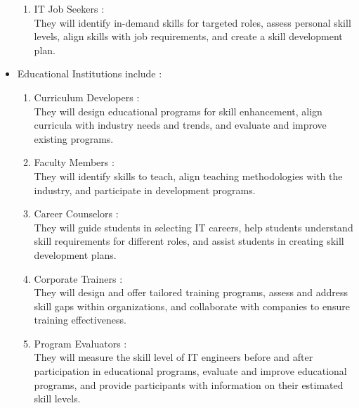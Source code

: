 \begin{itemize}
\begin{enumerate}
              \item IT Job Seekers : \\
                    They will identify in-demand skills for targeted roles, assess personal skill levels, align skills with job requirements, and create a skill development plan.
          \end{enumerate}
    \item Educational Institutions include : \\
          \begin{enumerate}
              \item Curriculum Developers : \\
                    They will design educational programs for skill enhancement, align curricula with industry needs and trends, and evaluate and improve existing programs. 
              \item Faculty Members : \\
                    They will identify skills to teach, align teaching methodologies with the industry, and participate in development programs. 
              \item Career Counselors : \\
                    They will guide students in selecting IT careers, help students understand skill requirements for different roles, and assist students in creating skill development plans. 
              \item Corporate Trainers : \\
                    They will design and offer tailored training programs, assess and address skill gaps within organizations, and collaborate with companies to ensure training effectiveness.  
              \item Program Evaluators : \\
                    They will measure the skill level of IT engineers before and after participation in educational programs, evaluate and improve educational programs, and provide participants with information on their estimated skill levels.  
          \end{enumerate}
          
\end{itemize}

